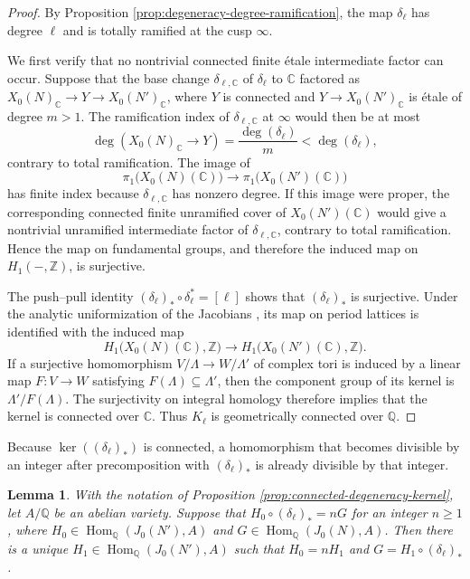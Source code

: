 \documentclass[12pt, letterpaper]{amsart}
\newtheorem{lemma}[theorem]{Lemma}
\theoremstyle{definition}
\theoremstyle{remark}
\newcommand{\Q}{\mathbb Q}
\newcommand{\C}{\mathbb C}
\newcommand{\Z}{\mathbb Z}
\newcommand{\Hom}{\operatorname{Hom}}
\numberwithin{equation}{section}
\begin{document}
\begin{proof}
By Proposition \ref{prop:degeneracy-degree-ramification}, the map
\(\delta_\ell\) has degree \(\ell\) and is totally ramified at the cusp
\(\infty\).

We first verify that no nontrivial connected finite \'etale intermediate
factor can occur. Suppose that the base change \(\delta_{\ell,\C}\) of
\(\delta_\ell\) to \(\C\) factored as
\(X_0(N)_{\C}\to Y\to X_0(N')_{\C}\), where \(Y\) is connected and
\(Y\to X_0(N')_{\C}\) is \'etale of degree \(m>1\). The ramification index of
\(\delta_{\ell,\C}\) at \(\infty\) would then be at most
\[
        \deg(X_0(N)_{\C}\to Y)
        =
        \frac{\deg(\delta_\ell)}{m}
        <
        \deg(\delta_\ell),
\]
contrary to total ramification.
The image of
\[
 \pi_1\bigl(X_0(N)(\C)\bigr)\longrightarrow
 \pi_1\bigl(X_0(N')(\C)\bigr)
\]
has finite index because \(\delta_{\ell,\C}\) has nonzero degree. If this image
were proper, the corresponding connected finite unramified cover of
\(X_0(N')(\C)\) would give a nontrivial unramified intermediate factor of
\(\delta_{\ell,\C}\), contrary to total ramification. Hence the map on
fundamental groups, and therefore the induced map on \(H_1(-,\Z)\), is
surjective.

The push--pull identity
\((\delta_\ell)_*\circ\delta_\ell^*=[\ell]\) shows that
\((\delta_\ell)_*\) is surjective. Under the analytic uniformization of the
Jacobians \cite{BirkenhakeLange}, its map on period lattices is
identified with the induced map
\[
 H_1\bigl(X_0(N)(\C),\Z\bigr)\longrightarrow
 H_1\bigl(X_0(N')(\C),\Z\bigr).
\]
If a surjective homomorphism \(V/\Lambda\to W/\Lambda'\) of complex
tori is induced by a linear map \(F:V\to W\) satisfying
\(F(\Lambda)\subseteq\Lambda'\), then the component group of its kernel is
\(\Lambda'/F(\Lambda)\). The surjectivity on integral homology therefore
implies that the kernel is connected over \(\C\). Thus \(K_\ell\) is
geometrically connected over \(\Q\).
\end{proof}

Because \(\ker((\delta_\ell)_*)\) is connected, a homomorphism that
becomes divisible by an integer after precomposition with
\((\delta_\ell)_*\) is already divisible by that integer.

\begin{lemma}\label{lem:connected-descent}
With the notation of Proposition
\ref{prop:connected-degeneracy-kernel}, let
\(A/\Q\) be an abelian variety. Suppose that
\(H_0\circ(\delta_\ell)_*=nG\) for an integer \(n\ge1\), where
\(H_0\in\Hom_\Q(J_0(N'),A)\) and \(G\in\Hom_\Q(J_0(N),A)\). Then there is a
unique \(H_1\in\Hom_\Q(J_0(N'),A)\) such that \(H_0=nH_1\) and
\(G=H_1\circ(\delta_\ell)_*\).
\end{lemma}
\end{document}
